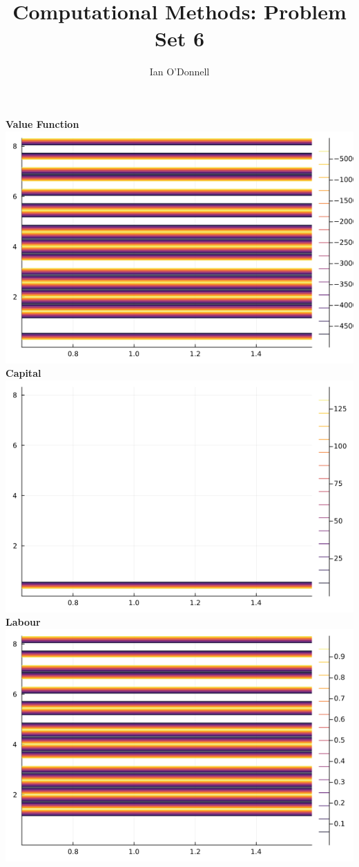 \documentclass{article}
\title{Computational Methods: Problem Set 6}
\author{Ian O'Donnell}
\date{\vspace{-5ex}}
\begin{document}
\maketitle

\begin{center}
    \textbf{Value Function} \\
    \includegraphics*[scale= 0.6]{p7.png}\\
    \textbf{Capital} \\
    \includegraphics*[scale= 0.6]{p8.png}\\
    \textbf{Labour} \\
    \includegraphics*[scale= 0.6]{p9.png}
\end{center}
\end{document}
